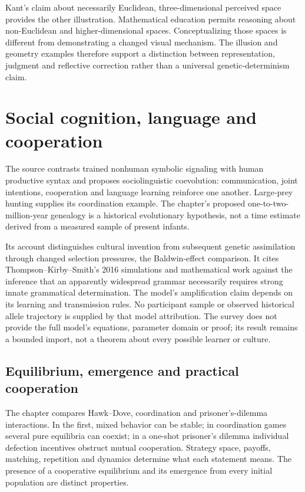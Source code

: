 Kant's claim about necessarily Euclidean, three-dimensional perceived space
provides the other illustration. Mathematical education permits reasoning
about non-Euclidean and higher-dimensional spaces. Conceptualizing those
spaces is different from demonstrating a changed visual mechanism. The
illusion and geometry examples therefore support a distinction between
representation, judgment and reflective correction rather than a universal
genetic-determinism claim.

\section{Social cognition, language and cooperation}
\label{sec:p19-r13-social}

The source contrasts trained nonhuman symbolic signaling with human
productive syntax and proposes sociolinguistic coevolution: communication,
joint intentions, cooperation and language learning reinforce one another.
Large-prey hunting supplies its coordination example. The chapter's proposed
one-to-two-million-year genealogy is a historical evolutionary hypothesis,
not a time estimate derived from a measured sample of present infants.

Its account distinguishes cultural invention from subsequent genetic
assimilation through changed selection pressures, the Baldwin-effect
comparison. It cites Thompson--Kirby--Smith's 2016 simulations and
mathematical work against the inference that an apparently widespread
grammar necessarily requires strong innate grammatical determination.
The model's amplification claim depends on its learning and transmission
rules. No participant sample or observed historical allele trajectory is
supplied by that model attribution. The survey does not provide the full
model's equations, parameter domain or proof; its result remains a bounded
import, not a theorem about every possible learner or culture.

\subsection{Equilibrium, emergence and practical cooperation}

The chapter compares Hawk--Dove, coordination and prisoner's-dilemma
interactions. In the first, mixed behavior can be stable; in coordination
games several pure equilibria can coexist; in a one-shot prisoner's dilemma
individual defection incentives obstruct mutual cooperation. Strategy space,
payoffs, matching, repetition and dynamics determine what each statement
means. The presence of a cooperative equilibrium and its emergence from
every initial population are distinct properties.

